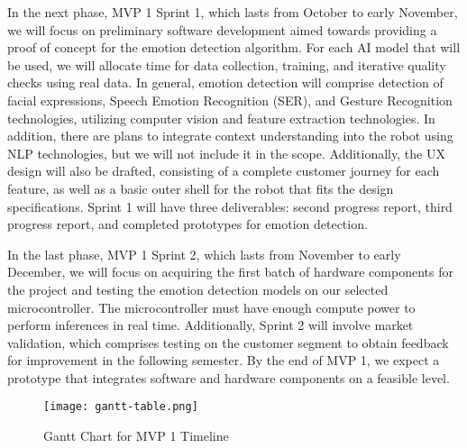 In the next phase, MVP 1 Sprint 1, which lasts from October to early November, we will focus on preliminary software development aimed towards providing a proof of concept for the emotion detection algorithm. For each AI model that will be used, we will allocate time for data collection, training, and iterative quality checks using real data. In general, emotion detection will comprise detection of facial expressions, Speech Emotion Recognition (SER), and Gesture Recognition technologies, utilizing computer vision and feature extraction technologies. In addition, there are plans to integrate context understanding into the robot using NLP technologies, but we will not include it in the scope. Additionally, the UX design will also be drafted, consisting of a complete customer journey for each feature, as well as a basic outer shell for the robot that fits the design specifications. Sprint 1 will have three deliverables: second progress report, third progress report, and completed prototypes for emotion detection.

In the last phase, MVP 1 Sprint 2, which lasts from November to early December, we will focus on acquiring the first batch of hardware components for the project and testing the emotion detection models on our selected microcontroller. The microcontroller must have enough compute power to perform inferences in real time. Additionally, Sprint 2 will involve market validation, which comprises testing on the customer segment to obtain feedback for improvement in the following semester. By the end of MVP 1, we expect a prototype that integrates software and hardware components on a feasible level.

\begin{figure}[ht]
    \centering
    \texttt{[image: gantt-table.png]}
    \caption{Gantt Chart for MVP 1 Timeline}
    \label{fig:gantt}
\end{figure}
\newpage
